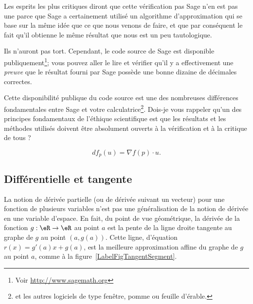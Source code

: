 \begin{remark}
    Les esprits les plus critiques diront que cette vérification pas Sage n'en est pas une parce que Sage a certainement utilisé un algorithme d'approximation qui se base sur la même idée que ce que nous venons de faire, et que par conséquent le fait qu'il obtienne le même résultat que nous est un peu tautologique.

    Ils n'auront pas tort. Cependant, le code source de Sage est disponible publiquement\footnote{Voir \url{http://www.sagemath.org}}; vous pouvez aller le lire et vérifier qu'il y a effectivement une \emph{preuve} que le résultat fourni par Sage possède une bonne dizaine de décimales correctes.

    Cette disponibilité publique du code source est une des nombreuses différences fondamentales entre Sage et votre calculatrice\footnote{et les autres logiciels de type fenêtre, pomme ou feuille d'érable.}. Dois-je vous rappeler qu'un des principes fondamentaux de l'éthique scientifique est que les résultats et les méthodes utilisés doivent être absolument ouverts à la vérification et à la critique de tous ?
\end{remark}

\begin{equation}        \label{Eqdfpunfpdu}
    df_p(u)=\nabla f(p)\cdot u.
\end{equation}

\subsection{Différentielle et tangente}

La notion de dérivée partielle (ou de dérivée suivant un vecteur) pour une fonction de plusieurs variables n'est pas une  généralisation de la notion de dérivée en une variable d'espace. En fait, du point de vue géométrique, la dérivée de la fonction $g:\eR\to\eR$ au point $a$ est la pente de la ligne droite tangente au graphe de $g$ au point $(a, g(a))$. Cette ligne, d'équation $r(x)=g'(a)x+g(a)$, est la meilleure approximation affine du graphe de $g$ au point $a$, comme à la figure~\ref{LabelFigTangentSegment}.
\newcommand{\CaptionFigTangentSegment}{Tangentes au graphe d'une fonction d'une variable}


